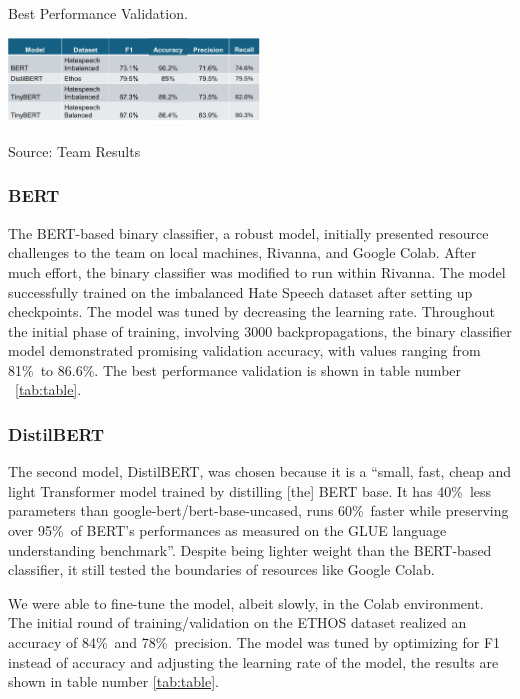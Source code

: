 \documentclass[conference]{IEEEtran}
\begin{document}
\begin{table}[h!]
  \caption{Best Performance Validation.}
  \label{tab:table}
  \centering\includegraphics[width=0.5\textwidth]{3.png}
  \caption*{Source: Team Results}
\end{table}

\subsubsection{BERT}
The BERT-based binary classifier, a robust model\cite{b14}, initially presented resource challenges to the team on local machines, Rivanna, and Google Colab. After much effort, the binary classifier was modified to run within Rivanna. The model successfully trained on the imbalanced Hate Speech dataset after setting up checkpoints\cite{b20}. The model was tuned by decreasing the learning rate. Throughout the initial phase of training, involving 3000 backpropagations, the binary classifier model demonstrated promising validation accuracy, with values ranging from 81\%\ to 86.6\%. The best performance validation is shown in table number ~\ref{tab:table}.

\subsubsection{DistilBERT}
The second model, DistilBERT, was chosen because it is a “small, fast, cheap and light Transformer model trained by distilling [the] BERT base. It has 40\%\ less parameters than google-bert/bert-base-uncased, runs 60\%\ faster while preserving over 95\%\ of BERT’s performances as measured on the GLUE language understanding benchmark”\cite{b16}. Despite being lighter weight than the BERT-based classifier, it still tested the boundaries of resources like Google Colab. 

We were able to fine-tune the model, albeit slowly, in the Colab environment. The initial round of training/validation on the ETHOS dataset realized an accuracy of 84\%\ and 78\%\ precision\cite{b21}. The model was tuned by optimizing for F1 instead of accuracy and adjusting the learning rate of the model, the results are shown in table number \ref{tab:table}.
\end{document}
